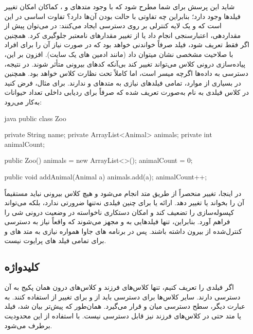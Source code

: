 شاید این پرسش برای شما مطرح شود که با وجود متدهای  و
 ، کماکان امکان تغییر فیلدها وجود دارد؛ بنابراین چه تفاوتی با
حالت  بودن آن‌ها دارد؟ تفاوت اساسی در این است که
 و  یک لایه کنترلی بر روی دسترسی ایجاد می‌کنند: در
 می‌توان پیش از مقداردهی، اعتبارسنجی انجام داد یا از تغییر
مقدارهای نامعتبر جلوگیری کرد. همچنین اگر فقط  تعریف شود، فیلد
صرفاً خواندنی  خواهد بود که در صورت نیاز آن را برای افراد
با صلاحیت مشخصی نشان میتوان داد (مانند ادمین های یک سایت). افزون بر این،
پیاده‌سازی درونی کلاس می‌تواند تغییر کند بی‌آنکه کدهای بیرونی متأثر شوند.
در نتیجه، دسترسی به داده‌ها اگرچه میسر است، اما کاملاً تحت نظارت کلاس
خواهد بود. همچنین در بسیاری از موارد، تمامی فیلدهای
 نیازی به متدهای  و  ندارند.
برای مثال، فرض کنید در کلاس  فیلدی به نام
 به‌صورت  تعریف شده که صرفاً
برای ردیابی داخلی تعداد حیوانات به‌کار می‌رود:

\begin{codebox}{java}
public class Zoo {
    private String name;
    private ArrayList<Animal> animals;
    private int animalCount;

    public Zoo() {
        animals = new ArrayList<>();
        animalCount = 0;
    }

    public void addAnimal(Animal a) {
        animals.add(a);
        animalCount++;
    }
}
\end{codebox}

در اینجا، تغییر  منحصراً از طریق متد
 انجام می‌شود و هیچ کلاس بیرونی نباید مستقیماً آن
را بخواند یا تغییر دهد. ارائه  یا  برای چنین فیلدی
نه‌تنها ضرورتی ندارد، بلکه می‌تواند کپسوله‌سازی را تضعیف کند و امکان
دستکاری ناخواسته در وضعیت درونی شی را فراهم آورد. بنابراین، تنها
فیلدهایی به  و  مجهز می‌شوند که واقعاً نیاز به
دسترسی کنترل‌شده از بیرون داشته باشند. پس در برنامه های جاوا همواره نیازی
به متد های  و  برای تمامی فیلد های پرایوت نیست.

\subsection{کلیدواژه }

اگر فیلدی را  تعریف کنیم، تنها کلاس‌های فرزند و
کلاس‌های درون همان پکیج به آن دسترسی دارند. سایر کلاس‌ها برای دسترسی باید
از  و برای تغییر از  استفاده کنند. به عبارت دیگر،
سطح دسترسی  میان  و
 قرار می‌گیرد. همان‌طور که پیش‌تر بیان شد، فیلد یا متد
 حتی در کلاس‌های فرزند نیز قابل دسترسی نیست. با
استفاده از  این محدودیت برطرف می‌شود.

